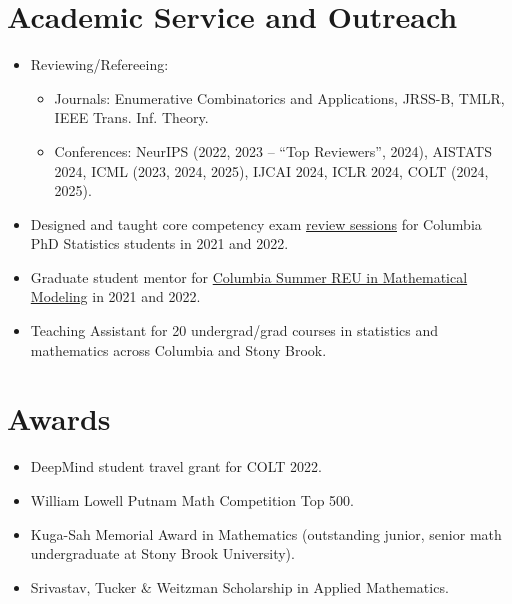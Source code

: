 \documentclass[10pt,a4paper]{moderncv}        %
\begin{document}
\section{Academic Service and Outreach}
\begin{minipage}{\maincolumnwidth}%
	\small{
    	\begin{itemize}
		\item[\textbullet] Reviewing/Refereeing:
			\begin{itemize}
				\item Journals: Enumerative Combinatorics and Applications, JRSS-B,  TMLR, IEEE Trans. Inf. Theory.
				\item Conferences: NeurIPS (2022, 2023 -- ``Top Reviewers'', 2024), AISTATS 2024, ICML (2023, 2024, 2025), IJCAI 2024, ICLR 2024, COLT (2024, 2025).
			\end{itemize}
		\item[\textbullet] Designed and taught core competency exam \href{https://www.columbia.edu/~js5338/review/}{\color{ao} review sessions} for Columbia PhD Statistics students in 2021 and 2022.
		\item[\textbullet] Graduate student mentor for \href{https://www.math.columbia.edu/programs-math/undergraduate-program/undergraduate-research/csuremm/}{\color{ao} Columbia Summer REU in Mathematical Modeling} in 2021 and 2022.
	\item[\textbullet] Teaching Assistant for 20 undergrad/grad courses in statistics and mathematics across Columbia and Stony Brook.
		\end{itemize}}%
\end{minipage}%

\section{Awards}
\begin{minipage}{\maincolumnwidth}%
	\small{
    	\begin{itemize}
	 \item[\textbullet] DeepMind student travel grant for COLT 2022.
	 \item[\textbullet] William Lowell Putnam Math Competition Top 500.
	  \item[\textbullet] Kuga-Sah Memorial Award in Mathematics (outstanding junior, senior math undergraduate at Stony Brook University).
          \item[\textbullet] Srivastav, Tucker \& Weitzman Scholarship in Applied Mathematics.
		\end{itemize}}%
\end{minipage}%
\end{document}
